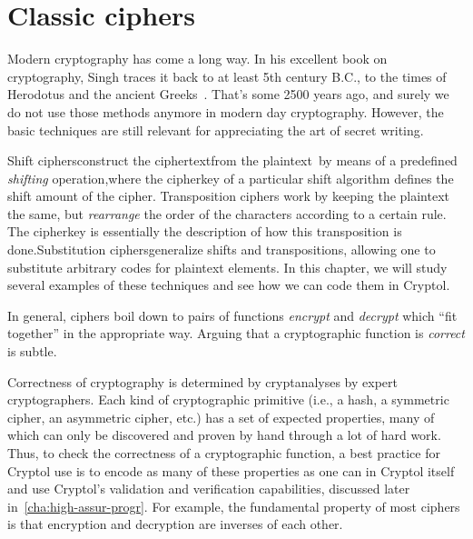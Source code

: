 
\chapter{Classic ciphers}
\label{chapter:classic}

Modern cryptography has come a long way. In his excellent book on
cryptography, Singh traces it back to at least 5th century B.C., to
the times of Herodotus and the ancient Greeks~\cite{Singh:1999:CBE}.
That's some 2500 years ago, and surely we do not use those methods
anymore in modern day cryptography. However, the basic techniques are
still relevant for appreciating the art of secret writing.

Shift ciphers\indShiftcipher construct the
ciphertext\glosCiphertext\indCiphertext from the
plaintext\glosPlaintext\indPlaintext\ by means of a predefined \emph{shifting}
operation,\glosCipherkey where the cipherkey of a particular shift
algorithm defines the shift amount of the cipher.\indCipherkey
Transposition ciphers work by keeping the plaintext the same, but
\emph{rearrange} the order of the characters according to a certain rule.
The cipherkey is essentially the description of how this transposition
is done.\indTranspositioncipher Substitution
ciphers\indSubstitutioncipher generalize shifts and transpositions,
allowing one to substitute arbitrary codes for plaintext elements.  In
this chapter, we will study several examples of these techniques and
see how we can code them in Cryptol.

In general, ciphers boil down to pairs of functions \emph{encrypt} and
\emph{decrypt} which ``fit together'' in the appropriate way.  Arguing
that a cryptographic function is \emph{correct} is subtle.

Correctness of cryptography is determined by cryptanalyses by expert
cryptographers.  Each kind of cryptographic primitive (i.e., a hash, a
symmetric cipher, an asymmetric cipher, etc.) has a set of expected
properties, many of which can only be discovered and proven by hand
through a lot of hard work.  Thus, to check the correctness of a
cryptographic function, a best practice for Cryptol use is to encode
as many of these properties as one can in Cryptol itself and use
Cryptol's validation and verification capabilities, discussed
later in~\autoref{cha:high-assur-progr}.  For example, the fundamental
property of most ciphers is that encryption and decryption are
inverses of each other.

